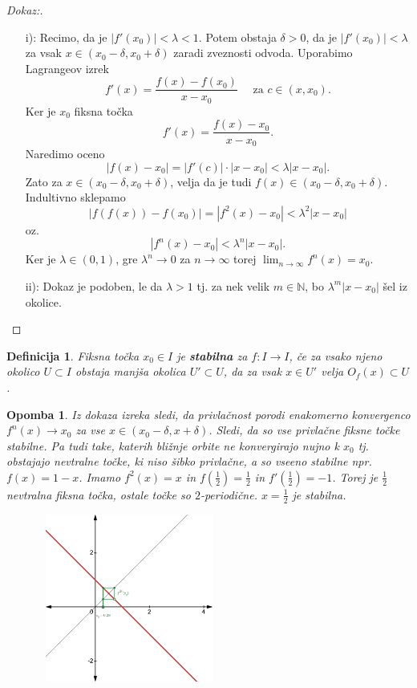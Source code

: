 \documentclass{article}
\newtheorem{definicija}{Definicija}
\newtheorem{opomba}{Opomba}
\newcommand{\N}{\mathbb{N}}
\begin{document}
\begin{proof}[Dokaz:]
\hfil
\begin{enumerate}
\item[i):] Recimo, da je $|f'(x_0)| < \lambda < 1$. Potem obstaja $\delta > 0$, da je $|f'(x_0)| < \lambda$ za vsak $x\in (x_0 - \delta, x_0 + \delta)$ zaradi zveznosti odvoda. Uporabimo Lagrangeov izrek
$$
f'(x) = \frac{f(x) - f(x_0)}{x - x_0} \quad \text{ za } c\in (x, x_0).
$$
Ker je $x_0$ fiksna točka
$$
f'(x) = \frac{f(x) - x_0}{x - x_0}.
$$
Naredimo oceno 
$$
|f(x) - x_0| = |f'(c)|\cdot |x - x_0| < \lambda |x - x_0|. 
$$
Zato za $x\in (x_0 - \delta, x_0 + \delta)$, velja da je tudi $f(x) \in (x_0 - \delta, x_0 + \delta)$. Indultivno sklepamo
$$
|f(f(x)) - f(x_0)| = |f^2(x) - x_0| < \lambda^2 |x - x_0|
$$
oz. 
$$
|f^n(x) - x_0| < \lambda^n |x - x_0|.
$$
Ker je $\lambda \in (0, 1)$, gre $\lambda^n \rightarrow 0$ za $n\rightarrow \infty$ torej $\lim_{n\rightarrow \infty} f^n(x) = x_0$.
\item[ii):] Dokaz je podoben, le da $\lambda > 1$ tj. za nek velik $m\in \N$, bo $\lambda^m |x - x_0|$ šel iz okolice.
\end{enumerate}
\end{proof}

\begin{definicija}
Fiksna točka $x_0 \in I$ je \textbf{stabilna} za $f:I \rightarrow I$, če za vsako njeno okolico $U \subset I$ obstaja manjša okolica $U' \subset U$, da za vsak $x\in U'$ velja $O_f(x) \subset U$.
\end{definicija}

\begin{opomba}
Iz dokaza izreka sledi, da privlačnost porodi enakomerno konvergenco 
$f^n(x) \rightarrow x_0$ za vse $x\in (x_0 - \delta, x + \delta)$.
Sledi, da so vse privlačne fiksne točke stabilne. 
Pa tudi take, katerih bližnje orbite ne konvergirajo nujno k $x_0$ tj. obstajajo 
nevtralne točke, ki niso šibko privlačne, a so vseeno stabilne npr. 
$f(x) = 1 - x$. Imamo $f^2(x) = x$ in $f(\frac{1}{2}) = \frac{1}{2}$ in 
$f'(\frac{1}{2}) = -1$. Torej je $\frac{1}{2}$ nevtralna fiksna točka, ostale 
točke so $2$-periodične. $x = \frac{1}{2}$ je stabilna.
\begin{figure}[h!]
    \center
        \includegraphics[width=6cm, height=5.5cm]{Grafi/cobweb5.png}
    \end{figure}    
\end{opomba}
\end{document}
